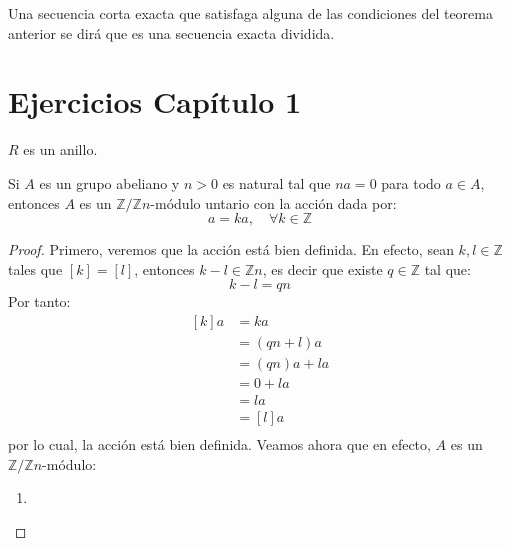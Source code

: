 \documentclass[12pt]{report}
\newcounter{it}
\theoremstyle{largebreak}
\begin{document}
    \begin{mydef}
        Una secuencia corta exacta que satisfaga alguna de las condiciones del teorema anterior se dirá que es una secuencia exacta dividida.
    \end{mydef}

    \newpage

    \section{Ejercicios Capítulo 1}

    \begin{obs}
        $R$ es un anillo.
    \end{obs}

    \begin{excer}
        Si $A$ es un grupo abeliano y $n>0$ es natural tal que $na=0$ para todo $a\in A$, entonces $A$ es un $\mathbb{Z}/\mathbb{Z}n$-módulo untario con la acción dada por:
        \begin{equation*}
            [k]a=ka,\quad\forall k\in\mathbb{Z}
        \end{equation*}
    \end{excer}

    \begin{proof}
        Primero, veremos que la acción está bien definida. En efecto, sean $k,l\in\mathbb{Z}$ tales que $[k]=[l]$, entonces $k-l\in\mathbb{Z}n$, es decir que existe $q\in\mathbb{Z}$ tal que:
        \begin{equation*}
            k-l=qn
        \end{equation*}
        Por tanto:
        \begin{equation*}
            \begin{split}
                [k]a&=ka\\
                &=(qn+l)a\\
                &=(qn)a+la\\
                &=0+la\\
                &=la\\
                &=[l]a\\
            \end{split}
        \end{equation*}
        por lo cual, la acción está bien definida. Veamos ahora que en efecto, $A$ es un $\mathbb{Z}/\mathbb{Z}n$-módulo:
        \begin{enumerate}[label = \textit{(\alph*)}]
            \item 
        \end{enumerate}
    \end{proof}
\end{document}
